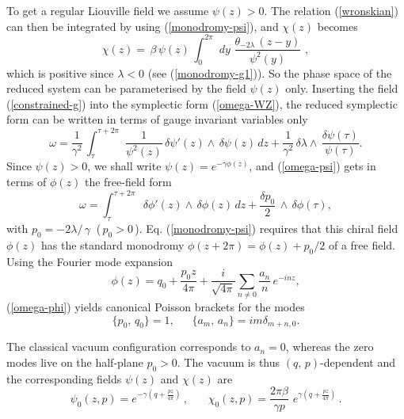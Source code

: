 \documentclass[a4paper,12pt]{article}
\begin{document}
\noindent
To get a regular Liouville field we assume $\psi (z)>0$. The relation
(\ref{wronskian}) can then be integrated by using (\ref{monodromy-psi}),
and $\chi(z)$ becomes
\begin{equation}\label{chi-psi}
\chi(z)=\,\beta\,\psi (z)\,\int_0^{2\pi}\,\,
dy\,\,\frac{\theta_{-2\lambda}\, (z-y)}{\psi^2(y)}\,\, ,
\end{equation}
which is positive since $\lambda <0$ (see
(\ref{monodromy-g1})). So the phase space of the reduced system can be
parameterised by the field $\psi(z)$ only.  Inserting the
field (\ref{constrained-g}) into the symplectic form (\ref{omega-WZ}),
the reduced
symplectic form can be written in terms of gauge invariant variables only
\begin{equation}\label{omega-psi}
\omega = \frac{1}{\gamma^2}\,
\int_\tau^{\tau +2\pi}\,\, \frac{1}{\psi^2(z)}
\,\delta\psi'(z)\wedge\,\delta\psi(z)\,dz +
\frac{1}{\gamma^2}\,
\delta\lambda \wedge\, \frac{\delta\psi(\tau)}{\psi(\tau)}.
\end{equation}
Since $\psi (z) >0$, we shall write $ \psi (z)=e^{-\gamma\phi(z)}$,
and (\ref{omega-psi}) gets in terms of $\phi(z)$ the free-field form
\begin{equation}\label{omega-phi}
\omega =
\int_\tau^{\tau +2\pi}\,\,
\,\delta\phi'(z)\wedge\,\delta\phi(z)\,dz +
\frac{\delta {p_0}}{2}\,
\wedge\, \delta\phi(\tau),
\end{equation}
with $p_0 =-{2\lambda}{/ \,\gamma}~$ (\,$p_0>0\,$). Eq. (\ref{monodromy-psi})
requires that this chiral field $\phi(z)$ has
the standard monodromy $\phi(z+2\pi)=\phi(z) +p_0/2$ of a free field.
Using the Fourier mode expansion
\begin{equation}\label{phi-mode}
\phi (z)= q_0+
\frac{p_0z}{4\pi}+\frac{i}{\sqrt {4\pi}}\sum_{n\neq 0}\frac{a_n}{n}\, e^{-inz},
\end{equation}
(\ref{omega-phi}) yields canonical Poisson brackets
for the modes
\begin{equation}\label{canonicalPB}
\{ p_0,\, q_0\} =1,~~~~~~~\{a_m,\, a_n\}=im\delta_{m+n,0}.
\end{equation}

\noindent
The classical vacuum configuration corresponds to $a_n=0$, whereas
the zero modes live on the half-plane $p_0>0$.
The vacuum is thus $(q,\, p)$-dependent and the corresponding fields
$\psi(z)$ and $\chi(z)$ are
\begin{equation}\label{vacuum}
\psi_0 (z,p)= e^{-\gamma\left (q+\frac{pz}{4\pi}\right)}\,,~~~~~~~~
\chi_0 (z,p)= \frac{2\pi\beta}{\gamma p}\,\,e^{\gamma\left (q
+\frac{ pz}{4\pi}\right)}\,.
\end{equation}
\end{document}
